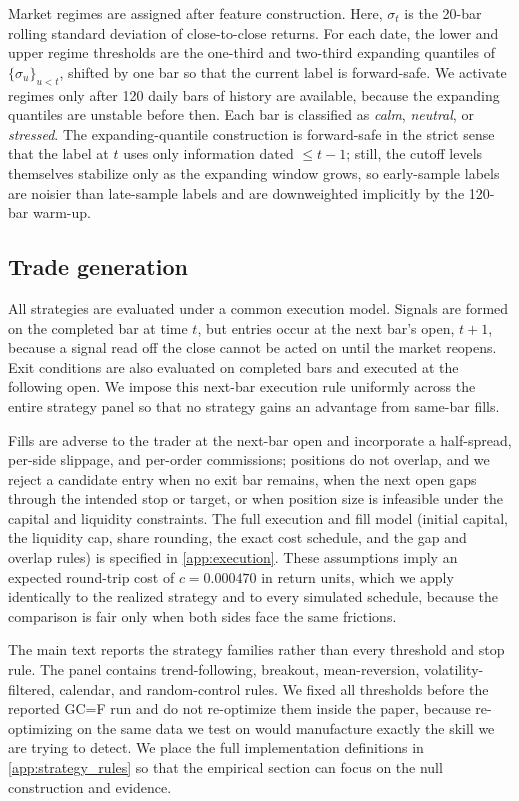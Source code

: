 \documentclass[preprint,12pt]{elsarticle}
\theoremstyle{definition}
\begin{document}
Market regimes are assigned after feature construction. Here, \(\sigma_t\) is the 20-bar rolling standard deviation of close-to-close returns. For each date, the lower and upper regime thresholds are the one-third and two-third expanding quantiles of \(\{\sigma_u\}_{u<t}\), shifted by one bar so that the current label is forward-safe. We activate regimes only after 120 daily bars of history are available, because the expanding quantiles are unstable before then. Each bar is classified as \emph{calm}, \emph{neutral}, or \emph{stressed}. The expanding-quantile construction is forward-safe in the strict sense that the label at $t$ uses only information dated $\le t-1$; still, the cutoff levels themselves stabilize only as the expanding window grows, so early-sample labels are noisier than late-sample labels and are downweighted implicitly by the 120-bar warm-up.

\subsection{Trade generation}

All strategies are evaluated under a common execution model. Signals are formed on the completed bar at time \(t\), but entries occur at the next bar's open, \(t+1\), because a signal read off the close cannot be acted on until the market reopens. Exit conditions are also evaluated on completed bars and executed at the following open. We impose this next-bar execution rule uniformly across the entire strategy panel so that no strategy gains an advantage from same-bar fills.

Fills are adverse to the trader at the next-bar open and incorporate a half-spread, per-side slippage, and per-order commissions; positions do not overlap, and we reject a candidate entry when no exit bar remains, when the next open gaps through the intended stop or target, or when position size is infeasible under the capital and liquidity constraints. The full execution and fill model (initial capital, the liquidity cap, share rounding, the exact cost schedule, and the gap and overlap rules) is specified in \ref{app:execution}. These assumptions imply an expected round-trip cost of $c=0.000470$ in return units, which we apply identically to the realized strategy and to every simulated schedule, because the comparison is fair only when both sides face the same frictions.

The main text reports the strategy families rather than every threshold and stop rule. The panel contains trend-following, breakout, mean-reversion, volatility-filtered, calendar, and random-control rules. We fixed all thresholds before the reported GC=F run and do not re-optimize them inside the paper, because re-optimizing on the same data we test on would manufacture exactly the skill we are trying to detect. We place the full implementation definitions in \ref{app:strategy_rules} so that the empirical section can focus on the null construction and evidence.
\end{document}
